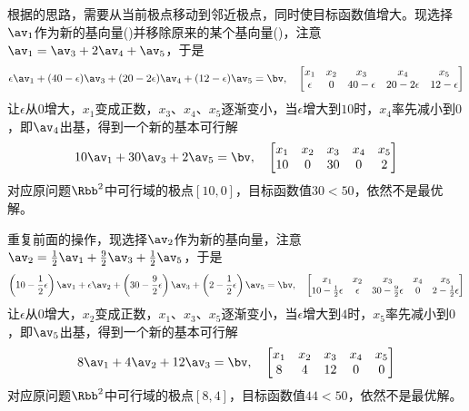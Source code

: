 \documentclass{ctexart}
\begin{document}
\begin{example}
    根据的思路，需要从当前极点移动到邻近极点，同时使目标函数值增大。现选择$\av_1$作为新的基向量()并移除原来的某个基向量()，注意$\av_1 = \av_3 + 2 \av_4 + \av_5$，于是
    \begin{align*}
        \epsilon \av_1 + (40 - \epsilon) \av_3 + (20 - 2 \epsilon) \av_4 + (12 - \epsilon) \av_5 = \bv, \quad
        \begin{bmatrix}
            x_1      & x_2 & x_3           & x_4             & x_5           \\
            \epsilon & 0   & 40 - \epsilon & 20 - 2 \epsilon & 12 - \epsilon
        \end{bmatrix}
    \end{align*}
    让$\epsilon$从$0$增大，$x_1$变成正数，$x_3$、$x_4$、$x_5$逐渐变小，当$\epsilon$增大到$10$时，$x_4$率先减小到$0$，即$\av_4$出基，得到一个新的基本可行解
    \begin{align*}
        10 \av_1 + 30 \av_3 + 2 \av_5 = \bv, \quad
        \begin{bmatrix}
            x_1 & x_2 & x_3 & x_4 & x_5 \\
            10  & 0   & 30  & 0   & 2
        \end{bmatrix}
    \end{align*}
    对应原问题$\Rbb^2$中可行域的极点$[10,0]$，目标函数值$30 < 50$，依然不是最优解。

    重复前面的操作，现选择$\av_2$作为新的基向量，注意$\av_2 = \frac{1}{2} \av_1 + \frac{9}{2} \av_3 + \frac{1}{2} \av_5$，于是
    \begin{align*}
        \left( 10 - \frac{1}{2} \epsilon \right) \av_1 + \epsilon \av_2 + \left( 30 - \frac{9}{2} \epsilon \right) \av_3 + \left( 2 - \frac{1}{2} \epsilon \right) \av_5 = \bv, \quad
        \begin{bmatrix}
            x_1                       & x_2      & x_3                       & x_4 & x_5                      \\
            10 - \frac{1}{2} \epsilon & \epsilon & 30 - \frac{9}{2} \epsilon & 0   & 2 - \frac{1}{2} \epsilon
        \end{bmatrix}
    \end{align*}
    让$\epsilon$从$0$增大，$x_2$变成正数，$x_1$、$x_3$、$x_5$逐渐变小，当$\epsilon$增大到$4$时，$x_5$率先减小到$0$，即$\av_5$出基，得到一个新的基本可行解
    \begin{align*}
        8 \av_1 + 4 \av_2 + 12 \av_3 = \bv, \quad
        \begin{bmatrix}
            x_1 & x_2 & x_3 & x_4 & x_5 \\
            8   & 4   & 12  & 0   & 0
        \end{bmatrix}
    \end{align*}
    对应原问题$\Rbb^2$中可行域的极点$[8,4]$，目标函数值$44 < 50$，依然不是最优解。


\end{example}
\end{document}
